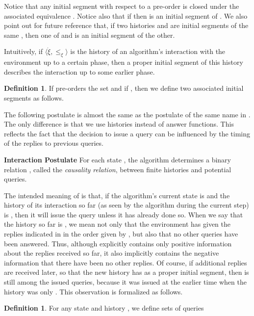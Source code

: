 \documentclass{LMCS}
\theoremstyle{definition}
\newtheorem{df}[thm]{Definition}
\newenvironment{unn}[1]{\bigskip\noindent\textbf{#1}\quad}{\par\bigskip}
\newcommand{\ans}{\dot}
\newcommand{\sq}[1]{\ensuremath{\langle#1\rangle}}
\begin{document}
Notice that any initial segment with respect to a pre-order  is
closed under the associated equivalence .  Notice also that if
 then 
is an initial segment of .  We also point out for future
reference that, if two histories  and  are initial
segments of the same , then one of  and  is an
initial segment of the other.

Intuitively, if \sq{{\ans\xi},\leq_\xi} is the history of an algorithm's
interaction with the environment up to a certain phase, then a proper
initial segment of this history describes the interaction up to some
earlier phase.

\begin{df}
  If  pre-orders the set  and if , then we define two
  associated initial segments as follows.
  \end{df}

The following postulate is almost the same as the postulate of the
same name in \cite{oa1}.  The only difference is that we use histories
instead of answer functions.  This reflects the fact that the decision
to issue a query can be influenced by the timing of the replies to
previous queries.

\begin{unn}{Interaction Postulate}
For each state , the algorithm determines a binary relation
  , called the \emph{causality relation}, between finite
  histories and potential queries.
\end{unn}

The intended meaning of  is that, if the algorithm's
current state is  and the history of its interaction so far (as
seen by the algorithm during the current step) is , then it will
issue the query  unless it has already done so.  When we say that
the history so far is , we mean not only that the environment has
given the replies indicated in  in the order given by
, but also that no other queries have been answered.  Thus,
although  explicitly contains only positive information about the
replies received so far, it also implicitly contains the negative
information that there have been no other replies.  Of course, if
additional replies are received later, so that the new history has
 as a proper initial segment, then  is still among the issued
queries, because it was issued at the earlier time when the history
was only .  This observation is formalized as follows.

\begin{df}
 For any state  and history , we define sets of queries
 \end{df}
\end{document}
